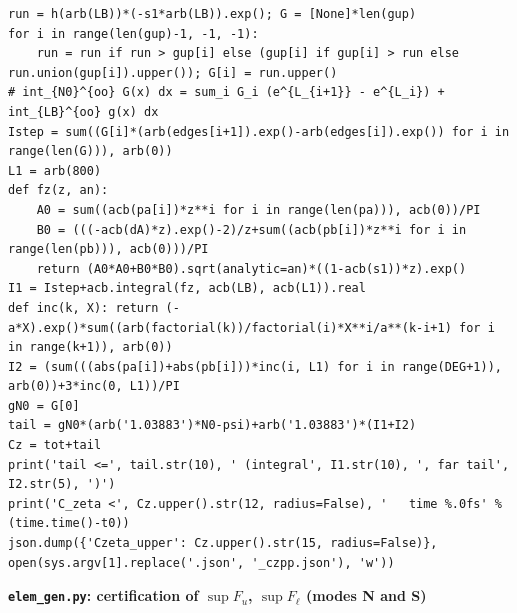\documentclass[11pt,reqno]{amsart}
\numberwithin{equation}{section}
\theoremstyle{definition}
\theoremstyle{remark}
\newcommand{\appsub}[1]{\par\medskip\noindent\textbf{#1}\par\nobreak\smallskip}
\begin{document}
\begin{lstlisting}
run = h(arb(LB))*(-s1*arb(LB)).exp(); G = [None]*len(gup)
for i in range(len(gup)-1, -1, -1):
    run = run if run > gup[i] else (gup[i] if gup[i] > run else run.union(gup[i]).upper()); G[i] = run.upper()
# int_{N0}^{oo} G(x) dx = sum_i G_i (e^{L_{i+1}} - e^{L_i}) + int_{LB}^{oo} g(x) dx
Istep = sum((G[i]*(arb(edges[i+1]).exp()-arb(edges[i]).exp()) for i in range(len(G))), arb(0))
L1 = arb(800)
def fz(z, an):
    A0 = sum((acb(pa[i])*z**i for i in range(len(pa))), acb(0))/PI
    B0 = (((-acb(dA)*z).exp()-2)/z+sum((acb(pb[i])*z**i for i in range(len(pb))), acb(0)))/PI
    return (A0*A0+B0*B0).sqrt(analytic=an)*((1-acb(s1))*z).exp()
I1 = Istep+acb.integral(fz, acb(LB), acb(L1)).real
def inc(k, X): return (-a*X).exp()*sum((arb(factorial(k))/factorial(i)*X**i/a**(k-i+1) for i in range(k+1)), arb(0))
I2 = (sum(((abs(pa[i])+abs(pb[i]))*inc(i, L1) for i in range(DEG+1)), arb(0))+3*inc(0, L1))/PI
gN0 = G[0]
tail = gN0*(arb('1.03883')*N0-psi)+arb('1.03883')*(I1+I2)
Cz = tot+tail
print('tail <=', tail.str(10), ' (integral', I1.str(10), ', far tail', I2.str(5), ')')
print('C_zeta <', Cz.upper().str(12, radius=False), '   time %.0fs' % (time.time()-t0))
json.dump({'Czeta_upper': Cz.upper().str(15, radius=False)}, open(sys.argv[1].replace('.json', '_czpp.json'), 'w'))
\end{lstlisting}
\appsub{\texttt{elem\_gen.py}: certification of $\sup F_u$, $\sup F_\ell$ (modes N and S)}
\label{app:cert_elem}
\end{document}
